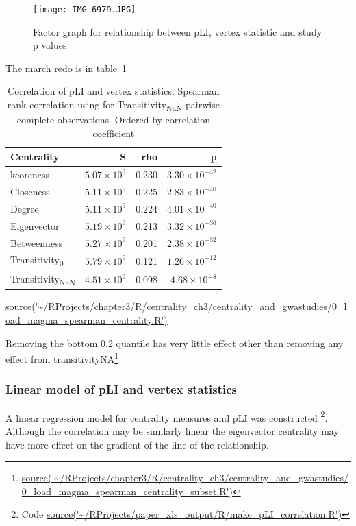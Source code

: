 \begin{figure}
    \centering
    \texttt{[image: IMG\_6979.JPG]}
    \caption{Factor graph for relationship between pLI, vertex statistic and study p values}
    \label{Figure:Factor graph for relationship between pLI, vertex statistic and study p values}
\end{figure}

 
 The march redo is in table~\ref{tab:correlation pli vertex statistics mar}
 
\begin{table}[ht]
\centering
\setlength{\extrarowheight}{2pt}
\begin{tabular}{lrrr}
  \toprule
Centrality & S & rho & p \\ 
  \midrule
kcoreness & $5.07 \times 10^{9}$ & 0.230 & $3.30 \times 10^{-42}$ \\ 
  Closeness & $5.11 \times 10^{9}$ & 0.225 & $2.83 \times 10^{-40}$ \\ 
  Degree & $5.11 \times 10^{9}$ & 0.224 & $4.01 \times 10^{-40}$ \\ 
  Eigenvector & $5.19 \times 10^{9}$ & 0.213 & $3.32 \times 10^{-36}$ \\ 
  Betweenness & $5.27 \times 10^{9}$ & 0.201 & $2.38 \times 10^{-32}$ \\ 
  Transitivity\textsubscript{0} & $5.79 \times 10^{9}$ & 0.121 & $1.26 \times 10^{-12}$ \\ 
  Transitivity\textsubscript{NaN} & $4.51 \times 10^{9}$ & 0.098 & $4.68 \times 10^{-8}$ \\ 
   \bottomrule
\end{tabular}
\caption{Correlation of pLI and vertex statistics. Spearman rank correlation using for Transitivity\textsubscript{NaN} pairwise complete observations.  Ordered by correlation coefficient}
\tiny\url{source('~/RProjects/chapter3/R/centrality_ch3/centrality_and_gwastudies/0_load_magma_spearman_centrality.R')}
\label{tab:correlation pli vertex statistics mar}
\end{table}

Removing the bottom 0.2 quantile has very little effect other than removing any effect from transitivityNA\footnote{\url{source('~/RProjects/chapter3/R/centrality_ch3/centrality_and_gwastudies/0_load_magma_spearman_centrality_subset.R')}}
\subsubsection{Linear model of pLI and vertex statistics}    
A linear regression model for centrality measures and pLI was constructed \footnote{Code \url{source('~/RProjects/paper_xls_output/R/make_pLI_correlation.R')}}. Although the correlation may be similarly linear the eigenvector centrality may have more effect on the gradient of the line of the relationship. 

